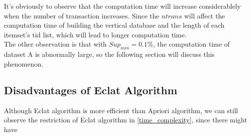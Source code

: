 \documentclass[a4paper, oneside, final, 12pt]{scrartcl} %
\begin{document}
It's obviously to observe that the computation time will increase considerablely
when the number of transaction increases. Since the $ntrans$ will affect the computation time
of building the vertical database and the length of each itemset's tid list, which will lead to
longer computation time. \\
The other observation is that with $Sup_{min} = 0.1\%$, the computation time of dataset A
is abnormally large, so the following section will discuss this phenomenon.

\subsection{Disadvantages of Eclat Algorithm}

Although Eclat algorithm is more efficient than Apriori algorithm,
we can still observe the restriction of Eclat algorithm in \ref{time_complexity},
since there might have 


\endgroup



\end{document}
